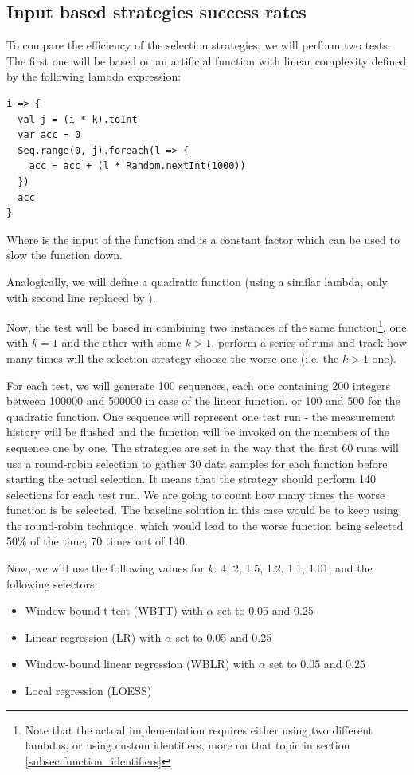 \subsection{Input based strategies success rates}
\label{subsec:input_based_strategies_success}

To compare the efficiency of the selection strategies, we will perform two tests. The first one will be based on an artificial function with linear complexity defined by the following lambda expression:

\lstset{style=Scala}
\begin{lstlisting}
i => {
  val j = (i * k).toInt
  var acc = 0
  Seq.range(0, j).foreach(l => {
    acc = acc + (l * Random.nextInt(1000))
  })
  acc
}
\end{lstlisting}

Where  is the input of the function and  is a constant factor which can be used to slow the function down.

Analogically, we will define a quadratic function (using a similar lambda, only with second line replaced by ).

Now, the test will be based in combining two instances of the same function\footnote{Note that the actual implementation requires either using two different lambdas, or using custom identifiers, more on that topic in section \ref{subsec:function_identifiers}}, one with $k=1$ and the other with some $k>1$, perform a series of runs and track how many times will the selection strategy choose the worse one (i.e. the $k>1$ one).

For each test, we will generate 100 sequences, each one containing 200 integers between 100000 and 500000 in case of the linear function, or 100 and 500 for the quadratic function. One sequence will represent one test run - the measurement history will be flushed and the function will be invoked on the members of the sequence one by one. The strategies are set in the way that the first 60 runs will use a round-robin selection to gather 30 data samples for each function before starting the actual selection. It means that the strategy should perform 140 selections for each test run. We are going to count how many times the worse function is be selected. The baseline solution in this case would be to keep using the round-robin technique, which would lead to the worse function being selected 50\% of the time, 70 times out of 140.

Now, we will use the following values for $k$: 4, 2, 1.5, 1.2, 1.1, 1.01, and the following selectors:
\begin{itemize}
	\item Window-bound t-test (WBTT) with $\alpha$ set to 0.05 and 0.25
	\item Linear regression (LR) with $\alpha$ set to 0.05 and 0.25
	\item Window-bound linear regression (WBLR) with $\alpha$ set to 0.05 and 0.25
	\item Local regression (LOESS)
\end{itemize}


